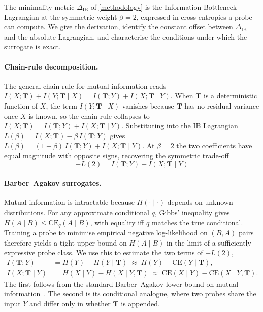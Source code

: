 The minimality metric $\Delta_{\text{IB}}$ of \cref{methodology} is the Information Bottleneck Lagrangian at the symmetric weight $\beta = 2$, expressed in cross-entropies a probe can compute. We give the derivation, identify the constant offset between $\Delta_{\text{IB}}$ and the absolute Lagrangian, and characterise the conditions under which the surrogate is exact.

\paragraph{Chain-rule decomposition.} The general chain rule for mutual information reads $I(X; \mathbf{T}) + I(Y; \mathbf{T} \mid X) = I(\mathbf{T}; Y) + I(X; \mathbf{T} \mid Y)$. When $\mathbf{T}$ is a deterministic function of $X$, the term $I(Y; \mathbf{T} \mid X)$ vanishes because $\mathbf{T}$ has no residual variance once $X$ is known, so the chain rule collapses to $I(X; \mathbf{T}) = I(\mathbf{T}; Y) + I(X; \mathbf{T} \mid Y)$. Substituting into the IB Lagrangian $L(\beta) = I(X; \mathbf{T}) - \beta\, I(\mathbf{T}; Y)$ gives $L(\beta) = (1 - \beta)\, I(\mathbf{T}; Y) + I(X; \mathbf{T} \mid Y)$. At $\beta = 2$ the two coefficients have equal magnitude with opposite signs, recovering the symmetric trade-off
\begin{equation}\label{eq:ib-decomposition}
    -L(2) = I(\mathbf{T}; Y) - I(X; \mathbf{T} \mid Y)
\end{equation}

\paragraph{Barber--Agakov surrogates.} Mutual information is intractable because $H(\cdot \mid \cdot)$ depends on unknown distributions. For any approximate conditional $q$, Gibbs' inequality gives $H(A \mid B) \le \text{CE}_q(A \mid B)$, with equality iff $q$ matches the true conditional. Training a probe to minimise empirical negative log-likelihood on $(B, A)$ pairs therefore yields a tight upper bound on $H(A \mid B)$ in the limit of a sufficiently expressive probe class. We use this to estimate the two terms of $-L(2)$,
\begin{align}
    I(\mathbf{T}; Y) &= H(Y) - H(Y \mid \mathbf{T}) \;\approx\; H(Y) - \text{CE}(Y \mid \mathbf{T}), \label{eq:ib-surrogate-y} \\
    I(X; \mathbf{T} \mid Y) &= H(X \mid Y) - H(X \mid Y, \mathbf{T}) \;\approx\; \text{CE}(X \mid Y) - \text{CE}(X \mid Y, \mathbf{T}). \label{eq:ib-surrogate-x}
\end{align}
The first follows from the standard Barber--Agakov lower bound on mutual information~\citep{barber2003variational}. The second is its conditional analogue, where two probes share the input $Y$ and differ only in whether $\mathbf{T}$ is appended.

